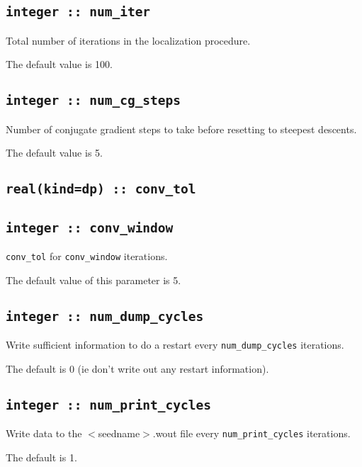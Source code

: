 \subsection[num\_iter]{\tt integer :: num\_iter}

Total number of iterations in the localization procedure.

The default value is 100.

\subsection[num\_cg\_steps]{\tt integer :: num\_cg\_steps}

Number of conjugate gradient steps to take before resetting to steepest descents.

The default value is 5.

\subsection[conv\_tol]{\tt real(kind=dp) :: conv\_tol}


\subsection[conv\_window]{\tt integer :: conv\_window}

\verb#conv_tol# for \verb#conv_window# iterations.

The default value of this parameter is 5.


\subsection[num\_dump\_cycles]{\tt integer :: num\_dump\_cycles}
Write sufficient information to do a restart every
\verb#num_dump_cycles# iterations.

The default is 0 (ie don't write out any restart information).

\subsection[num\_print\_cycles]{\tt integer :: num\_print\_cycles}
Write data to the $<$seedname$>$.wout file every
\verb#num_print_cycles# iterations.
                                                                                                                              
The default is 1.
                                                                                                                              
